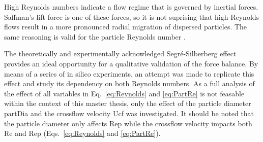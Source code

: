 High Reynolds numbers indicate a flow regime that is governed by inertial forces. Saffman's lift force is one of these forces, so it is not suprising that high Reynolds flows result in a more pronounced radial migration %
of dispersed particles. The same reasoning is valid for the particle Reynolds number \citep{DiCarlo2007}.  \par
The theoretically and experimentally acknowledged Segr\'e-Silberberg effect provides an ideal opportunity for a qualitative validation of the force balance. By means of a series of in silico experiments, an attempt was made to replicate this effect and study its dependency on both Reynolds numbers. As a full analysis of the effect of all variables in Eq.\ \eqref{eq:Reynolds} and \eqref{eq:PartRe} is not feasable within the context of this master thesis, only the effect of the particle diameter \gls{partDia} and the crossflow velocity \gls{Ucf} was investigated. It should be noted that the particle diameter only affects \gls{Rep} while the crossflow velocity impacts both \gls{Re} and \gls{Rep} (Eqs.\ \eqref{eq:Reynolds} and \eqref{eq:PartRe}).

% 
% 

